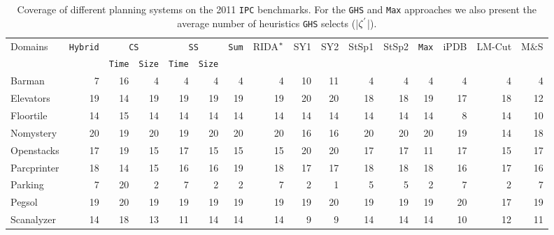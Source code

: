 \begin{table}[htb]
\footnotesize\setlength{\tabcolsep}{1.8pt}
\centering
\caption{Coverage of different planning systems on the 2011 \texttt{IPC} benchmarks. For the \texttt{GHS} and \texttt{Max} approaches we also present the average number of heuristics \texttt{GHS} selects (|$\zeta\sp{'}$|).}
\begin{tabular}{lrrrrrrrrrrrrrrr}
\hline
\multirow{2}{*}{Domains} & \multirow{2}{*}{\texttt{Hybrid}} & \multicolumn{2}{c}{\texttt{CS}} & \multicolumn{2}{c}{\texttt{SS}} & \multirow{2}{*}{\texttt{Sum}} & \multirow{2}{*}{RIDA$\sp{*}$} & \multirow{2}{*}{SY1} & \multirow{2}{*}{SY2} & \multirow{2}{*}{StSp1} & \multirow{2}{*}{StSp2} & \multirow{2}{*}{\texttt{Max}} & \multirow{2}{*}{iPDB} & \multirow{2}{*}{LM-Cut} & \multirow{2}{*}{M$\&$S} \\ \cline{3-6}
                         &                                    & \texttt{Time} & \texttt{Size} & \texttt{Time} & \texttt{Size} &                                 &                       &                      &                      &                        &                        &                                 &                       &                         &                         \\ \hline
Barman&         7&     16&     4&    4&    4&   4&   4&   10&   11&   4&   4&    4&   4&   4&   4\\
Elevators&     19&     14&    19&   19&   19&  19&  19&   20&   20&  18&  18&   19&  17&  18&  12\\
Floortile&     14&     15&    14&   14&   14&  14&  14&   14&   14&  14&  14&   14&   8&  14&  10\\
Nomystery&     20&     19&    20&   19&   20&  20&  20&   16&   16&  20&  20&   20&  19&  14&  18\\
Openstacks&    17&     19&    15&   17&   15&  15&  15&   20&   20&  17&  17&   11&  17&  15&  17\\
Parcprinter&   18&     14&    15&   16&   16&  19&  18&   17&   17&  18&  18&   18&  16&  17&  16\\
Parking&        7&     20&     2&    7&    2&   2&   7&    2&    1&   5&   5&    2&   7&   2&   7\\
Pegsol&        19&     20&    19&   19&   19&  19&  19&   19&   20&  19&  19&   19&  20&  17&  19\\
Scanalyzer&    14&     18&    13&   11&   14&  14&  14&    9&    9&  14&  14&   14&  10&  12&  11\\

\end{tabular}
\end{table}
